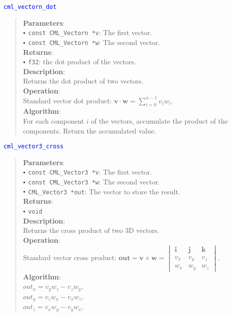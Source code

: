 \documentclass[a4paper,oneside,8pt]{extarticle}
\newcommand{\function}[1]{
  \noindent\textcolor{blue}{\texttt{#1}}
  \vspace{-0.3em}
}
\renewcommand{\dot}{\raisebox{0.3ex}{\scalebox{0.6}{$\bullet$}}}
\theoremstyle{definition}
\begin{document}
\function{cml\_vectorn\_dot}
\begin{quote}
  \textbf{Parameters}: \\
  $\dot$ \texttt{const CML\_Vectorn *v}: The first vector. \\
  $\dot$ \texttt{const CML\_Vectorn *w}: The second vector. \\
  \textbf{Returns}: \\
  $\dot$ \texttt{f32}: the dot product of the vectors. \\

  \vspace{-0.75em}
  \textbf{Description}: \\
  Returns the dot product of two vectors. \\

  \vspace{-0.75em}
  \textbf{Operation}: \\
  Standard vector dot product: $\mathbf{v} \cdot \mathbf{w} = \sum_{i=0}^{n-1} v_iw_i$. \\

  \vspace{-0.75em}
  \textbf{Algorithm}: \\
  For each component $i$ of the vectors, accumulate the product of the components. Return the accumulated value. \\
\end{quote}

\function{cml\_vector3\_cross}
\begin{quote}
  \textbf{Parameters}: \\
  $\dot$ \texttt{const CML\_Vector3 *v}: The first vector. \\
  $\dot$ \texttt{const CML\_Vector3 *w}: The second vector. \\
  $\dot$ \texttt{CML\_Vector3 *out}: The vector to store the result. \\
  \textbf{Returns}: \\
  $\dot$ \texttt{void} \\

  \vspace{-0.75em}
  \textbf{Description}: \\
  Returns the cross product of two 3D vectors. \\

  \vspace{-0.75em}
  \textbf{Operation}: \\
  Standard vector cross product: $\mathbf{out} = \mathbf{v} \times \mathbf{w} = \begin{vmatrix}
  \mathbf{i} & \mathbf{j} & \mathbf{k} \\
  v_x & v_y & v_z \\
  w_x & w_y & w_z
  \end{vmatrix}$. \\

  \vspace{-0.75em}
  \textbf{Algorithm}: \\
  $out_x = v_yw_z - v_zw_y$, \\
  $out_y = v_zw_x - v_xw_z$, \\
  $out_z = v_xw_y - v_yw_x$. \\
\end{quote}
\end{document}
